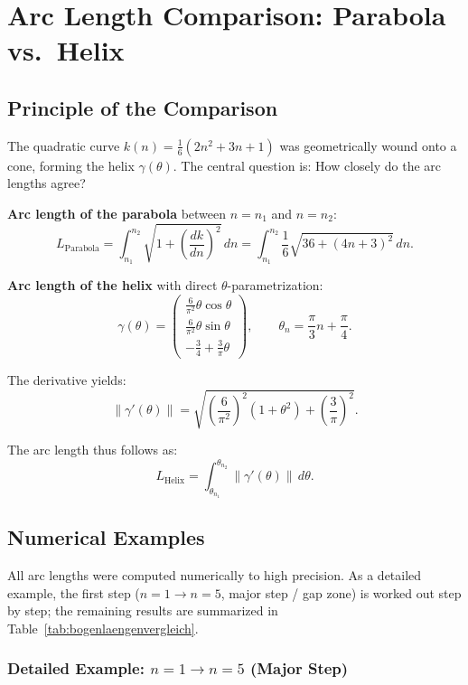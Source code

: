 \chapter{Arc Length Comparison: Parabola vs.\ Helix}\label{sec:beispiele}

\section{Principle of the Comparison}

The quadratic curve $k(n) = \frac{1}{6}(2n^2 + 3n + 1)$ was geometrically
wound onto a cone, forming the helix $\gamma(\theta)$.
The central question is: How closely do the arc lengths agree?


\textbf{Arc length of the parabola} between $n = n_1$ and $n = n_2$:
\[
L_{\text{Parabola}} = \int_{n_1}^{n_2} \sqrt{1 + \left(\frac{dk}{dn}\right)^2}\, dn
= \int_{n_1}^{n_2} \frac{1}{6}\sqrt{36 + (4n+3)^2}\, dn.
\]

\textbf{Arc length of the helix} with direct $\theta$-parametrization:
\[
\gamma(\theta) = \begin{pmatrix}
\frac{6}{\pi^2}\theta\cos\theta\\[4pt]
\frac{6}{\pi^2}\theta\sin\theta\\[4pt]
-\frac{3}{4} + \frac{3}{\pi}\theta
\end{pmatrix},
\qquad
\theta_n = \frac{\pi}{3}n + \frac{\pi}{4}.
\]

The derivative yields:
\[
\|\gamma'(\theta)\| = \sqrt{\left(\frac{6}{\pi^2}\right)^2(1 + \theta^2)
+ \left(\frac{3}{\pi}\right)^2}.
\]

The arc length thus follows as:
\[
L_{\text{Helix}} = \int_{\theta_{n_1}}^{\theta_{n_2}} \|\gamma'(\theta)\|\, d\theta.
\]

\section{Numerical Examples}

All arc lengths were computed numerically to high precision.
As a detailed example, the first step
($n = 1 \to n = 5$, major step / gap zone) is worked out step by step;
the remaining results are summarized in
Table~\ref{tab:bogenlaengenvergleich}.

\subsection{Detailed Example: \texorpdfstring{$n = 1 \rightarrow n = 5$}{n = 1 → n = 5}
 (Major Step)}

